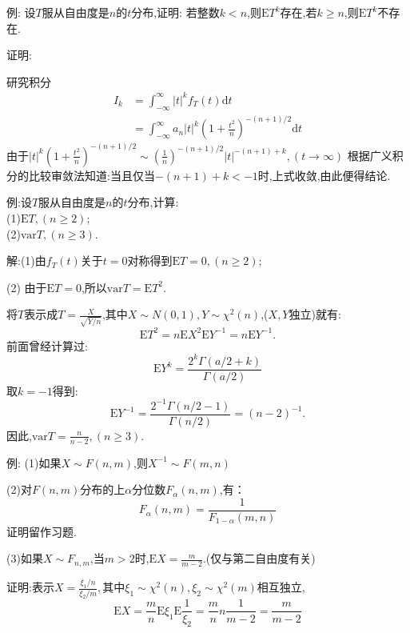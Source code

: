 	\begin{frame}
		例: 设$T$服从自由度是$n$的$t$分布,证明:
		若整数$k<n$,则$\mathrm{E}T^k$存在,若$k\geqslant n$,则$\mathrm{E}T^k$不存在.
		
		证明:
		
		研究积分\begin{equation}
			\begin{split}
				I_k &= \int_{-\infty}^{\infty} |t|^kf_T(t)\mathrm{d}t \\
				&= \int_{-\infty}^{\infty} a_n|t|^k\left(1+\frac{t^2}{n}\right)^{-(n+1)/2}\mathrm{d}t
			\end{split}
		\end{equation}
		由于$|t|^k\left(1+\frac{t^2}{n}\right)^{-(n+1)/2}\sim (\frac{1}{n})^{-(n+1)/2}|t|^{-(n+1)+k},(t\rightarrow\infty)$
		根据广义积分的比较审敛法知道:当且仅当$-(n+1)+k<-1$时,上式收敛,由此便得结论.
	\end{frame}

	\begin{frame}
		例:设$T$服从自由度是$n$的$t$分布,计算: \\
		(1)$\mathrm{E}T,(n\geqslant 2)$;\\
		(2)$\mathrm{var}T,(n\geqslant 3)$.
		
		解:(1)由$f_T(t)$关于$t=0$对称得到\alert{$\mathrm{E}T = 0,(n\geqslant 2)$};
		
		(2) 由于$\mathrm{E}T = 0$,所以$\mathrm{var}T = \mathrm{E}T^2$.
		
		将$T$表示成$T=\frac{X}{\sqrt{Y/n}}$,其中$X\sim N(0,1),Y\sim\chi^2(n)$,($X,Y$独立)就有:
		\begin{equation}
			\mathrm{E}T^2 = n\mathrm{E}X^2\mathrm{E}Y^{-1} = n\mathrm{E}Y^{-1}.
		\end{equation}
		前面曾经计算过:
		\begin{equation}
			\mathrm{E}Y^k = \frac{2^k\Gamma(a/2+k)}{\Gamma(a/2)}
		\end{equation}
		取$k=-1$得到:
		\begin{equation}
			\mathrm{E}Y^{-1} = \frac{2^{-1}\Gamma(n/2-1)}{\Gamma(n/2)} = (n-2)^{-1}.
		\end{equation}
		因此,\alert{$\mathrm{var}T = \frac{n}{n-2},(n\geqslant 3)$.}
	\end{frame}

	\begin{frame}
		例: (1)如果$X\sim F(n,m)$,则$X^{-1}\sim F(m,n)$
		
		(2)对$F(n,m)$分布的上$\alpha$分位数$F_{\alpha}(n,m)$,有：
		\alert{
		\begin{equation}
			F_{\alpha}(n,m) = \frac{1}{F_{1-\alpha}(m,n)}
		\end{equation}	
		}
		证明留作习题.
		
		(3)如果$X\sim F_{n,m}$,当$m>2$时,$\mathrm{E}X = \frac{m}{m-2}$.(仅与第二自由度有关)
		
		证明:表示$X = \frac{\xi_1/n}{\xi_2/m},$其中$\xi_1\sim\chi^2(n),\xi_2\sim\chi^2(m)$相互独立,
		\begin{equation}
			\mathrm{E}X = \frac{m}{n}\mathrm{E}\xi_1\mathrm{E}\frac{1}{\xi_2} = \frac{m}{n}n\frac{1}{m -2} = \frac{m}{m-2}
		\end{equation}
	\end{frame}
